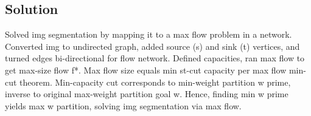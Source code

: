 \subsection*{Solution}
Solved img segmentation by mapping it to a max flow problem in a network.
Converted img to undirected graph, added source (s) and sink (t) vertices, and turned edges bi-directional for flow network.
Defined capacities, ran max flow to get max-size flow f*.
Max flow size equals min st-cut capacity per max flow min-cut theorem.
Min-capacity cut corresponds to min-weight partition w prime, inverse to original max-weight partition goal w.
Hence, finding min w prime yields max w partition, solving img segmentation via max flow.

